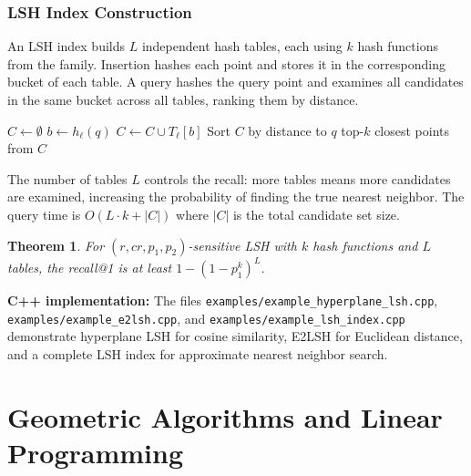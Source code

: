 \documentclass[twoside,12pt]{book}
\theoremstyle{plain}
\newtheorem{theorem}{Theorem}[chapter]
\theoremstyle{definition}
\theoremstyle{remark}
\newenvironment{cpplisting}{\begin{center}\small}{\end{center}}
\begin{document}
\subsection{LSH Index Construction}

An LSH index builds $L$ independent hash tables, each using $k$ hash functions from the family. Insertion hashes each point and stores it in the corresponding bucket of each table. A query hashes the query point and examines all candidates in the same bucket across all tables, ranking them by distance.

\begin{algorithm}[htbp]
\caption{LSH Index: Query}
\label{alg:lsh-query}
\begin{algorithmic}[1]
  \State $C \gets \emptyset$ 
    \State $b \gets h_\ell(q)$ 
    \State $C \gets C \cup T_\ell[b]$ 
  \EndFor
  \State Sort $C$ by distance to $q$
  \State \Return top-$k$ closest points from $C$
\EndFunction
\end{algorithmic}
\end{algorithm}

The number of tables $L$ controls the recall: more tables means more candidates are examined, increasing the probability of finding the true nearest neighbor. The query time is $O(L \cdot k + |C|)$ where $|C|$ is the total candidate set size.

\begin{theorem}\label{thm:lsh-recall}
For $(r, cr, p_1, p_2)$-sensitive LSH with $k$ hash functions and $L$ tables, the recall@1 is at least $1 - (1 - p_1^k)^L$.
\end{theorem}

\begin{cpplisting}
\textbf{C++ implementation:} The files \texttt{examples/example\_hyperplane\_lsh.cpp}, \texttt{examples/example\_e2lsh.cpp}, and \texttt{examples/example\_lsh\_index.cpp} demonstrate hyperplane LSH for cosine similarity, E2LSH for Euclidean distance, and a complete LSH index for approximate nearest neighbor search.
\end{cpplisting}


\chapter{Geometric Algorithms and Linear Programming}
\label{ch:geometric}
\end{document}
